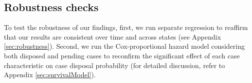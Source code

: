 \documentclass[12pt,a4paper]{article}
\begin{document}
	
	
	\subsection*{Robustness checks}
	
	To test the robustness of our findings, first, we run separate regression to reaffirm that our results are consistent over time and across states (see Appendix \ref{sec:robustness}). Second, we run the Cox-proportional hazard model considering both disposed and pending cases to reconfirm the significant effect of each case characteristic on case disposal probability (for detailed discussion, refer to Appendix \ref{sec:survivalModel}). 
	
	
\end{document}

